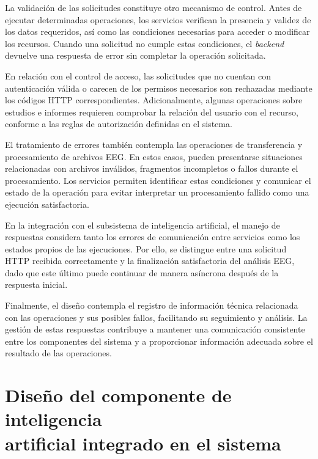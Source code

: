 La validación de las solicitudes constituye
otro mecanismo de control. Antes de ejecutar
determinadas operaciones, los servicios
verifican la presencia y validez de los datos
requeridos, así como las condiciones necesarias
para acceder o modificar los recursos.
Cuando una solicitud no cumple estas
condiciones, el \textit{backend} devuelve una respuesta
de error sin completar la operación solicitada.

En relación con el control de acceso,
las solicitudes que no cuentan con
autenticación válida o carecen de los
permisos necesarios son rechazadas mediante
los códigos HTTP correspondientes.
Adicionalmente, algunas operaciones sobre
estudios e informes requieren comprobar
la relación del usuario con el recurso,
conforme a las reglas de autorización
definidas en el sistema.

El tratamiento de errores también contempla
las operaciones de transferencia y
procesamiento de archivos EEG. En estos
casos, pueden presentarse situaciones
relacionadas con archivos inválidos,
fragmentos incompletos o fallos durante
el procesamiento. Los servicios permiten
identificar estas condiciones y comunicar
el estado de la operación para evitar
interpretar un procesamiento fallido
como una ejecución satisfactoria.

En la integración con el subsistema de
inteligencia artificial, el manejo de
respuestas considera tanto los errores
de comunicación entre servicios como
los estados propios de las ejecuciones.
Por ello, se distingue entre una solicitud
HTTP recibida correctamente y la finalización
satisfactoria del análisis EEG, dado que
este último puede continuar de manera
asíncrona después de la respuesta inicial.

Finalmente, el diseño contempla el registro
de información técnica relacionada con
las operaciones y sus posibles fallos,
facilitando su seguimiento y análisis.
La gestión de estas respuestas contribuye
a mantener una comunicación consistente
entre los componentes del sistema y
a proporcionar información adecuada
sobre el resultado de las operaciones.


\section[Diseño del componente de inteligencia artificial integrado en el sistema]{Diseño del componente de inteligencia\\artificial integrado en el sistema}
\label{sec:diseno-componente-ia}

